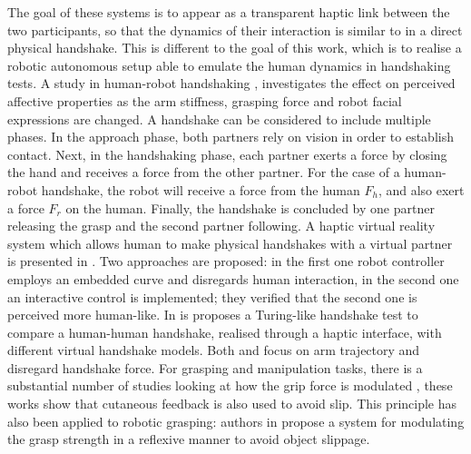 The goal of these systems is to appear as a transparent haptic link between the two participants, so that the dynamics of their interaction is similar to in a direct physical handshake. This is different to the goal of this work, which is to realise a robotic autonomous setup able to emulate the human dynamics in handshaking tests.
%
A study in human-robot handshaking \cite{Tsalamlal2015}, investigates the effect on perceived affective properties as the arm stiffness, grasping force and robot facial expressions are changed. 
%
A handshake can be considered to include multiple phases. In the approach phase, both partners rely on vision in order to establish contact. Next, in the handshaking phase, each partner exerts a force by closing the hand and receives a force from the other partner. 
For the case of a human-robot handshake, the robot will receive a force from the human $F_{h}$, and also exert a force $F_{r}$ on the human. Finally, the handshake is concluded by one partner releasing the grasp and the second partner following.
%	
A haptic virtual reality system which allows human to make physical handshakes with a virtual partner is presented in \cite{wang2011handshake}. Two approaches are proposed: in the first one robot controller employs an embedded curve and disregards human interaction, in the second one an interactive control is implemented; they verified that the second one is perceived more human-like. 
In \cite{karniel2010turing} is proposes a Turing-like handshake test to compare a human-human handshake, realised through a haptic interface, with different virtual handshake models.
Both \cite{wang2011handshake} and  \cite{karniel2010turing} focus on arm trajectory and disregard handshake force. 
For grasping and manipulation tasks, there is a substantial number of studies looking at how the grip force is modulated \cite{johansson1992sensory,eliasson1995development,witney2004cutaneous}, these works show that cutaneous feedback is also used to avoid slip. 
%
This principle has also been applied to robotic grasping: authors in \cite{ajoudani2016reflex} propose a system for modulating the grasp strength in a reflexive manner to avoid object slippage.\\
%




